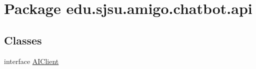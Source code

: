 \hypertarget{namespaceedu_1_1sjsu_1_1amigo_1_1chatbot_1_1api}{}\section{Package edu.\+sjsu.\+amigo.\+chatbot.\+api}
\label{namespaceedu_1_1sjsu_1_1amigo_1_1chatbot_1_1api}
\subsection*{Classes}
\begin{DoxyCompactItemize}
\item 
interface \hyperlink{interfaceedu_1_1sjsu_1_1amigo_1_1chatbot_1_1api_1_1_a_i_client}{A\+I\+Client}
\end{DoxyCompactItemize}
